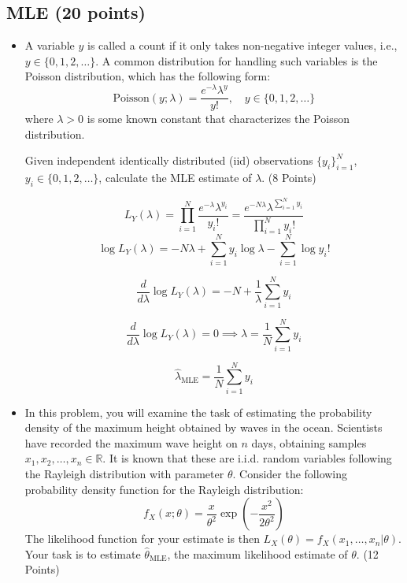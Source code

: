 \documentclass[a3paper,12pt]{article} %
\begin{document}
\subsection{MLE (20 points)}
\begin{itemize}
    \item A variable \( y \) is called a count if it only takes non-negative integer values, i.e., \( y \in \{0, 1, 2, \ldots\} \). A common distribution for handling such variables is the Poisson distribution, which has the following form:
    \[
    \text{Poisson}(y; \lambda) = \frac{e^{-\lambda} \lambda^y}{y!}, \quad y \in \{0, 1, 2, \ldots\}
    \]
    where \( \lambda > 0 \) is some known constant that characterizes the Poisson distribution.
    
    Given independent identically distributed (iid) observations \( \{y_i\}_{i=1}^N \), \( y_i \in \{0, 1, 2, \ldots\} \), calculate the MLE estimate of \( \lambda \). (8 Points)

    \[
    L_Y(\lambda) = \prod_{i=1}^N \frac{e^{-\lambda} \lambda^{y_i}}{y_i!} = \frac{e^{-N\lambda} \lambda^{\sum_{i=1}^N y_i}}{\prod_{i=1}^N y_i!}
    \]
    \[
    \log L_Y(\lambda) = -N\lambda + \sum_{i=1}^N y_i \log \lambda - \sum_{i=1}^N \log y_i!
    \]

    \[
    \frac{d}{d\lambda} \log L_Y(\lambda) = -N + \frac{1}{\lambda} \sum_{i=1}^N y_i
    \]

    \[
    \frac{d}{d\lambda} \log L_Y(\lambda) = 0 \implies \lambda = \frac{1}{N} \sum_{i=1}^N y_i
    \]

    \[
    \hat{\lambda}_{\text{MLE}} = \frac{1}{N} \sum_{i=1}^N y_i
    \]

    \item In this problem, you will examine the task of estimating the probability density of the maximum height obtained by waves in the ocean. Scientists have recorded the maximum wave height on \( n \) days, obtaining samples \( x_1, x_2, \ldots, x_n \in \mathbb{R} \). It is known that these are i.i.d. random variables following the Rayleigh distribution with parameter \( \theta \). Consider the following probability density function for the Rayleigh distribution:
    \[
    f_X(x; \theta) = \frac{x}{\theta^2} \exp\left(-\frac{x^2}{2\theta^2}\right)
    \]
    The likelihood function for your estimate is then \( L_X(\theta) = f_X(x_1, \ldots, x_n|\theta) \). Your task is to estimate \( \hat{\theta}_{\text{MLE}} \), the maximum likelihood estimate of \( \theta \). (12 Points)


\end{itemize}
\end{document}
